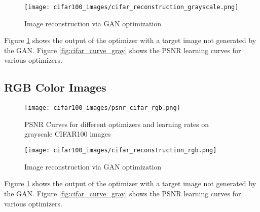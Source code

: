 \documentclass{article}
\begin{document}
\begin{figure}[h!]
  \centering
  \texttt{[image: cifar100\_images/cifar\_reconstruction\_grayscale.png]}
  \caption{Image reconstruction via GAN optimization}
  \label{fig:cifar_recon_gray}
\end{figure}
\FloatBarrier

Figure \ref{fig:cifar_recon_gray} shows the output of the optimizer with a target image not generated by the GAN.  Figure \ref{fig:cifar_curve_gray} shows the PSNR learning curves for various optimizers.

\subsection{RGB Color Images}
\begin{figure}[h!]
  \centering
  \texttt{[image: cifar100\_images/psnr\_cifar\_rgb.png]}
  \caption{PSNR Curves for different optimizers and learning rates on grayscale CIFAR100 images}
  \label{fig:cifar_curve_rgb}
\end{figure}
\FloatBarrier

\begin{figure}[h!]
  \centering
  \texttt{[image: cifar100\_images/cifar\_reconstruction\_rgb.png]}
  \caption{Image reconstruction via GAN optimization}
  \label{fig:cifar_recon_rgb}
\end{figure}
\FloatBarrier

Figure \ref{fig:cifar_recon_gray} shows the output of the optimizer with a target image not generated by the GAN.  Figure \ref{fig:cifar_curve_gray} shows the PSNR learning curves for various optimizers.
\end{document}
